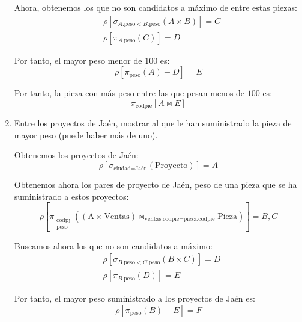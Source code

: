 \begin{ejercicio}
\begin{enumerate}
        Ahora, obtenemos los que no son candidatos a máximo de entre estas piezas:
        \begin{align*}
            &\rho\left[\sigma_{A.\text{peso}<B.\text{peso}}(A\times B)\right]=C\\
            &\rho\left[\pi_{A.\text{peso}}(C)\right]=D
        \end{align*}

        Por tanto, el mayor peso menor de $100$ es:
        \begin{equation*}
            \rho\left[\pi_{\text{peso}}(A)-D\right]=E
        \end{equation*}

        Por tanto, la pieza con más peso entre las que pesan menos de $100$ es:
        \begin{equation*}
            \pi_{\text{codpie}}\left[A\bowtie E\right]
        \end{equation*}
        \item Entre los proyectos de Jaén, mostrar al que le han suministrado la pieza de mayor peso (puede haber más de uno).
        
        Obtenemos los proyectos de Jaén:
        \begin{equation*}
            \rho\left[\sigma_{\text{ciudad}=\text{Jaén}}(\text{Proyecto})\right]=A
        \end{equation*}

        Obtenemos ahora los pares de proyecto de Jaén, peso de una pieza que se ha suministrado a estos proyectos:
        \begin{equation*}
            \rho\left[\pi_{\substack{\text{codpj}\\\text{peso}}}\left(\left(\text{A}\bowtie \text{Ventas}\right)\bowtie_{\text{ventas.codpie}=\text{pieza.codpie}} \text{Pieza}\right)\right]=B,C
        \end{equation*}

        Buscamos ahora los que no son candidatos a máximo:
        \begin{align*}
            &\rho\left[\sigma_{B.\text{peso}<C.\text{peso}}(B\times C)\right]=D\\
            &\rho\left[\pi_{B.\text{peso}}(D)\right]=E
        \end{align*}

        Por tanto, el mayor peso suministrado a los proyectos de Jaén es:
        \begin{equation*}
            \rho\left[\pi_{\text{peso}}(B)-E\right]=F
        \end{equation*}


\end{enumerate}
\end{ejercicio}
